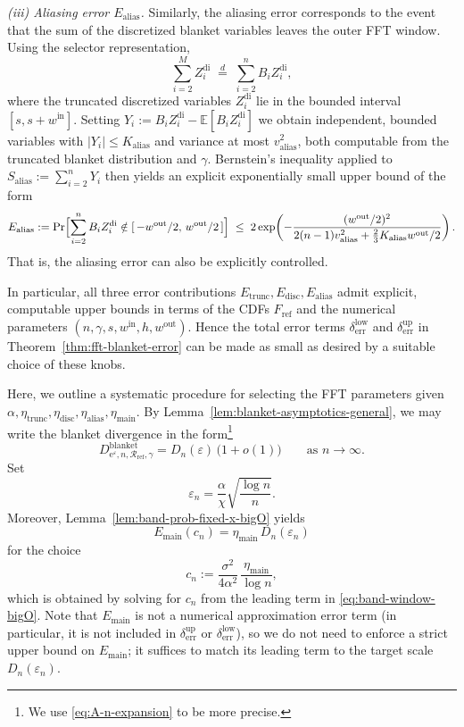 \documentclass{article}
\theoremstyle{plain}
\theoremstyle{definition}
\begin{document}
\smallskip

\emph{(iii) Aliasing error $E_{\mathrm{alias}}$.}
Similarly, the aliasing error corresponds to the event that the sum of
the discretized blanket variables leaves the outer FFT window. Using
the selector representation,
\[
  \sum_{i=2}^M Z_i^{\mathrm{di}}
  \;\stackrel{d}{=}\;
  \sum_{i=2}^n B_i Z_i^{\mathrm{di}},
\]
where the truncated discretized variables $Z_i^{\mathrm{di}}$ lie in the
bounded interval $[s,s+w^{\mathrm{in}}]$. Setting
$Y_i := B_i Z_i^{\mathrm{di}} - \mathbb E[B_i Z_i^{\mathrm{di}}]$ we
obtain independent, bounded variables with $|Y_i|\le K_{\mathrm{alias}}$
and variance at most $v_{\mathrm{alias}}^2$, both computable from the
truncated blanket distribution and $\gamma$. Bernstein's inequality
applied to $S_{\mathrm{alias}} := \sum_{i=2}^n Y_i$ then yields an
explicit exponentially small upper bound of the form
\[
  E_{\mathrm{alias}}
  :=
  \Pr\Bigl[
    \sum_{i=2}^n B_i Z_i^{\mathrm{di}}
    \notin
    [\,-w^{\mathrm{out}}/2,\, w^{\mathrm{out}}/2\,]
  \Bigr]
  \;\le\;
  2\exp\!\left(
    -\frac{(w^{\mathrm{out}}/2)^2}{
      2(n-1)v_{\mathrm{alias}}^2
      + \frac{2}{3}K_{\mathrm{alias}} w^{\mathrm{out}}/2
    }
  \right).
\]
That is, the aliasing error can also be explicitly controlled.


In particular, all three error contributions
$E_{\mathrm{trunc}},E_{\mathrm{disc}},E_{\mathrm{alias}}$ admit explicit,
computable upper bounds in terms of the CDFs
$F_{\mathrm {ref}}$ and the numerical parameters
$(n,\gamma,s,w^{\mathrm{in}},h,w^{\mathrm{out}})$. Hence the total
error terms $\delta_{\mathrm{err}}^{\mathrm{low}}$ and
$\delta_{\mathrm{err}}^{\mathrm{up}}$ in
Theorem~\ref{thm:fft-blanket-error} can be made as small as desired by
a suitable choice of these knobs.

Here, we outline a systematic procedure for selecting the FFT
parameters given $\alpha,\eta_{\mathrm{trunc}},\eta_{\mathrm{disc}},\eta_{\mathrm{alias}},\eta_{\mathrm{main}}$.
By Lemma~\ref{lem:blanket-asymptotics-general}, we may write the blanket
divergence in the form\footnote{We use \eqref{eq:A-n-expansion} to be more precise.}
\[
  D^{\mathrm{blanket}}_{\mathrm e^\varepsilon,n,\mathcal R_{\mathrm{ref}},\gamma}
  =
  D_n(\varepsilon)\,\bigl(1+o(1)\bigr)
  \qquad\text{as } n\to\infty.
\]
Set
\[
  \varepsilon_n
  =
  \frac{\alpha}{\chi}\sqrt{\frac{\log n}{n}}.
\]
Moreover, Lemma~\ref{lem:band-prob-fixed-x-bigO} yields
\[
  E_{\mathrm{main}}(c_n) = \eta_{\mathrm{main}}\,D_n(\varepsilon_n)
\]
for the choice
\[
  c_n
  :=
  \frac{\sigma^2}{4\alpha^2}\,\frac{\eta_{\mathrm{main}}}{\log n},
\]
which is obtained by solving for $c_n$ from the leading term in
\eqref{eq:band-window-bigO}.
Note that $E_{\mathrm{main}}$ is not a numerical approximation error term
(in particular, it is not included in
$\delta_{\mathrm{err}}^{\mathrm{up}}$ or
$\delta_{\mathrm{err}}^{\mathrm{low}}$), so we do not need to enforce a
strict upper bound on $E_{\mathrm{main}}$; it suffices to match its
leading term to the target scale $D_n(\varepsilon_n)$.
\end{document}
